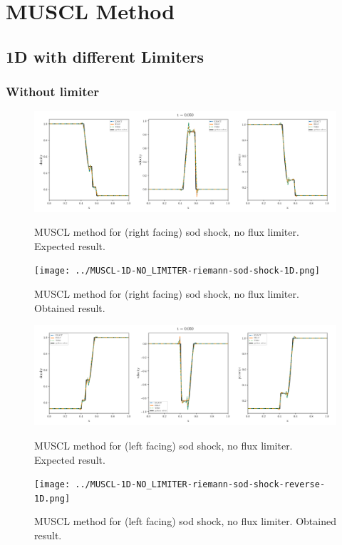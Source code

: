 \section{MUSCL Method}

\subsection{1D with different Limiters}



\subsubsection{Without limiter}

    \begin{figure}[htbp]
        \centering
        \includegraphics[width=.9\textwidth]{./figures/MUSCL-1D-NO_LIMITER-riemann-sod-shock-1D.png}%
        \caption{MUSCL method for (right facing) sod shock, no flux limiter. Expected result.}
        \texttt{[image: ../MUSCL-1D-NO\_LIMITER-riemann-sod-shock-1D.png]}%
        \caption{MUSCL method for (right facing) sod shock, no flux limiter. Obtained result.}
    \end{figure}


    \begin{figure}[htbp]
        \centering
        \includegraphics[width=.9\textwidth]{./figures/MUSCL-1D-NO_LIMITER-riemann-sod-shock-reverse-1D.png}%
        \caption{MUSCL method for (left facing) sod shock, no flux limiter. Expected result.}
        \texttt{[image: ../MUSCL-1D-NO\_LIMITER-riemann-sod-shock-reverse-1D.png]}%
        \caption{MUSCL method for (left facing) sod shock, no flux limiter. Obtained result.}
    \end{figure}









